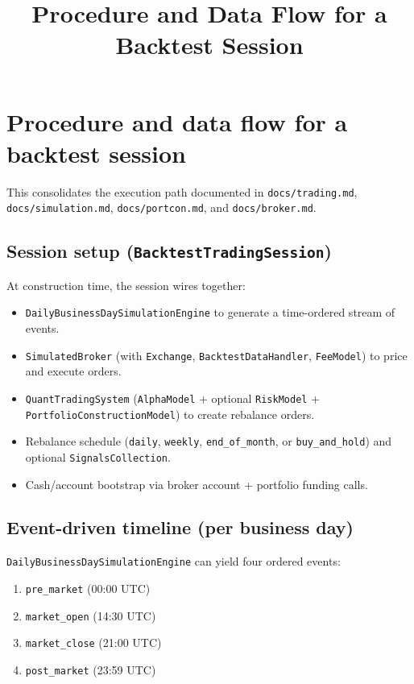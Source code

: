 \documentclass[11pt]{article}
\begin{document}
\title{ \Huge{Procedure and Data Flow for a Backtest Session} }
\date{}

\maketitle

\tableofcontents

\newpage

\section{Procedure and data flow for a backtest session}

This consolidates the execution path documented in \texttt{docs/trading.md}, \texttt{docs/simulation.md}, \texttt{docs/portcon.md}, and \texttt{docs/broker.md}.

\subsection{Session setup (\texttt{BacktestTradingSession})}

At construction time, the session wires together:

\begin{itemize}[leftmargin=*]
  \item \texttt{DailyBusinessDaySimulationEngine} to generate a time-ordered stream of events.
  \item \texttt{SimulatedBroker} (with \texttt{Exchange}, \texttt{BacktestDataHandler}, \texttt{FeeModel}) to price and execute orders.
  \item \texttt{QuantTradingSystem} (\texttt{AlphaModel} + optional \texttt{RiskModel} + \texttt{PortfolioConstructionModel}) to create rebalance orders.
  \item Rebalance schedule (\texttt{daily}, \texttt{weekly}, \texttt{end\_of\_month}, or \texttt{buy\_and\_hold}) and optional \texttt{SignalsCollection}.
  \item Cash/account bootstrap via broker account + portfolio funding calls.
\end{itemize}

\subsection{Event-driven timeline (per business day)}

\texttt{DailyBusinessDaySimulationEngine} can yield four ordered events:

\begin{enumerate}[leftmargin=*]
  \item \texttt{pre\_market} (00:00 UTC)
  \item \texttt{market\_open} (14:30 UTC)
  \item \texttt{market\_close} (21:00 UTC)
  \item \texttt{post\_market} (23:59 UTC)
\end{enumerate}
\end{document}
